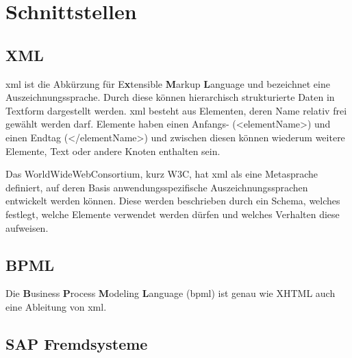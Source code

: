 \section{Schnittstellen}

\subsection{XML}
\label{sec:export-xml}

\gls{xml} ist die Abkürzung für E\textbf{x}tensible \textbf{M}arkup \textbf{L}anguage und bezeichnet eine Auszeichnungssprache. Durch diese können hierarchisch strukturierte Daten in Textform dargestellt werden. \gls{xml} besteht aus Elementen, deren Name relativ frei gewählt werden darf. Elemente haben einen Anfangs- (<elementName>) und einen Endtag (</elementName>) und zwischen diesen können wiederum weitere Elemente, Text oder andere Knoten enthalten sein. 

Das WorldWideWebConsortium, kurz W3C, hat \gls{xml} als eine Metasprache definiert, auf deren Basis anwendungsspezifische Auszeichnungssprachen entwickelt werden können. Diese werden beschrieben durch ein Schema, welches festlegt, welche Elemente verwendet werden dürfen und welches Verhalten diese aufweisen.

\subsection{BPML}
\label{sec:export-bpml}

Die \textbf{B}usiness \textbf{P}rocess \textbf{M}odeling \textbf{L}anguage (\gls{bpml}) ist genau wie XHTML auch eine Ableitung von \gls{xml}.

\subsection{SAP Fremdsysteme}
\label{sec:export-sap}
